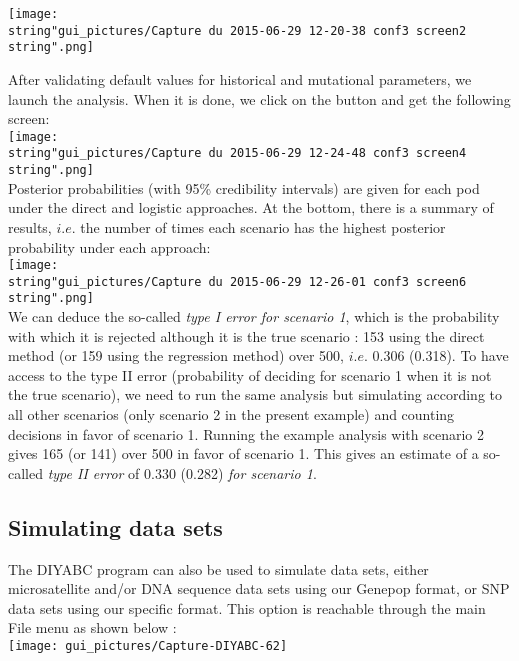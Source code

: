 \texttt{[image: \\string"gui\_pictures/Capture du 2015-06-29 12-20-38 conf3 screen2\\string".png]}

After validating default values for historical and mutational parameters,
we launch the analysis. When it is done, we click on the  button and get the following screen:\\


\texttt{[image: \\string"gui\_pictures/Capture du 2015-06-29 12-24-48 conf3 screen4\\string".png]}\\


Posterior probabilities (with 95\% credibility intervals) are given
for each pod under the direct and logistic approaches. At the bottom,
there is a summary of results, $i.e.$ the number of times each scenario
has the highest posterior probability under each approach:\\


\texttt{[image: \\string"gui\_pictures/Capture du 2015-06-29 12-26-01 conf3 screen6\\string".png]}\\


We can deduce the so-called \textit{type I error for scenario 1},
which is the probability with which it is rejected although it is
the true scenario : 153 using the direct method (or 159 using the
regression method) over 500, $i.e.$ 0.306 (0.318). To have access
to the type II error (probability of deciding for scenario 1 when
it is not the true scenario), we need to run the same analysis but
simulating according to all other scenarios (only scenario 2 in the
present example) and counting decisions in favor of scenario 1. Running
the example analysis with scenario 2 gives 165 (or 141) over 500 in
favor of scenario 1. This gives an estimate of a so-called \textit{type
II error} of 0.330 (0.282) \textit{for scenario 1}.


\subsection{Simulating data sets}

The DIYABC program can also be used to simulate data sets, either
microsatellite and/or DNA sequence data sets using our Genepop format,
or SNP data sets using our specific format. This option is reachable
through the main \textsf{File} menu as shown below :\\


\texttt{[image: gui\_pictures/Capture-DIYABC-62]} \\


